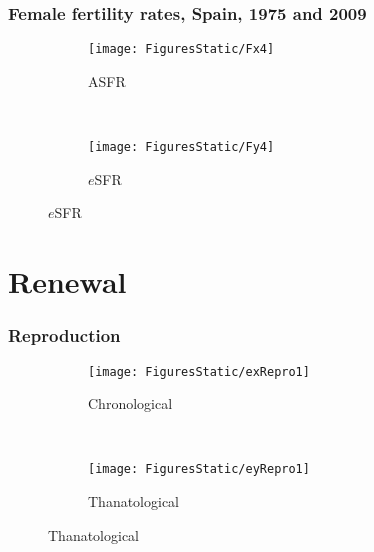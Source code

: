 \documentclass{beamer}
\begin{document}
\begin{frame}
\frametitle{Female fertility rates, Spain, 1975 and 2009}
\vspace{-5em}
\begin{figure}
        \centering
        \begin{subfigure}[b]{0.5\textwidth}
                \centering
                \caption*{ASFR}
                \texttt{[image: FiguresStatic/Fx4]}
        \end{subfigure}%
        ~ %
        \begin{subfigure}[b]{0.5\textwidth}
                \centering
                \caption*{$e$SFR}
                \texttt{[image: FiguresStatic/Fy4]}
        \end{subfigure}
\end{figure}
\end{frame}


\section{Renewal}


\begin{frame}
\frametitle{Reproduction}
\vspace{-5em}
\begin{figure}
        \centering
        \begin{subfigure}[b]{0.5\textwidth}
                \centering
                \caption*{Chronological}
                \texttt{[image: FiguresStatic/exRepro1]}
        \end{subfigure}%
        ~ %
        \begin{subfigure}[b]{0.5\textwidth}
                \centering
                \caption*{Thanatological}
                \texttt{[image: FiguresStatic/eyRepro1]}
        \end{subfigure}
\end{figure}
\end{frame}
\end{document}
